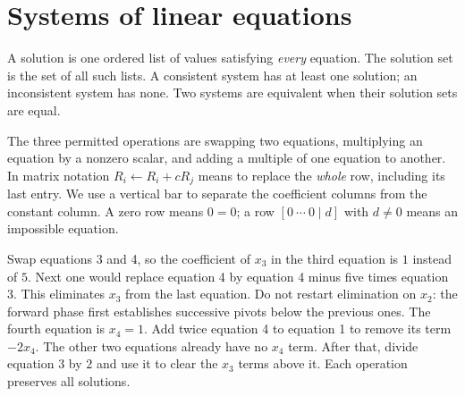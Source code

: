 \section{Systems of linear equations}
A solution is one ordered list of values satisfying \emph{every} equation.
The solution set is the set of all such lists. A consistent system has at
least one solution; an inconsistent system has none. Two systems are
equivalent when their solution sets are equal.

The three permitted operations are swapping two equations, multiplying an
equation by a nonzero scalar, and adding a multiple of one equation to another.
In matrix notation $R_i\leftarrow R_i+cR_j$ means to replace the \emph{whole}
row, including its last entry. We use a vertical bar to separate the
coefficient columns from the constant column. A zero row means $0=0$;
a row $[0\ \cdots\ 0\mid d]$ with $d\ne0$ means an impossible equation.

Swap equations 3 and 4, so the coefficient of $x_3$ in the third equation
is $1$ instead of $5$. Next one would replace equation 4 by equation 4
minus five times equation 3. This eliminates $x_3$ from the last equation.
Do not restart elimination on $x_2$: the forward phase first establishes
successive pivots below the previous ones.
The fourth equation is $x_4=1$. Add twice equation 4 to equation 1 to
remove its term $-2x_4$. The other two equations already have no $x_4$
term. After that, divide equation 3 by $2$ and use it to clear the $x_3$
terms above it. Each operation preserves all solutions.

